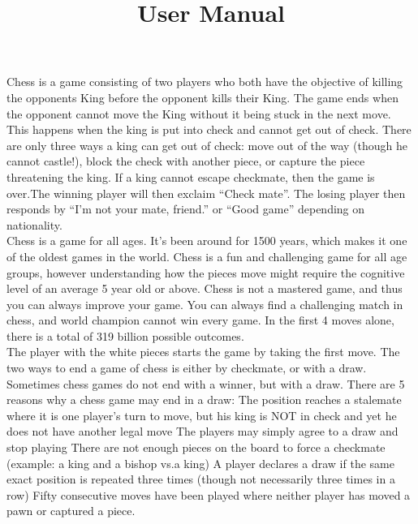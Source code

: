 \documentclass{article}
\begin{document}
\title{User Manual}
\maketitle
Chess is a game consisting of two players who both have the objective of killing the opponents King before the opponent kills their King. The game ends when the opponent cannot move the King without it being stuck in the next move. This happens when the king is put into check and cannot get out of check. There are only three ways a king can get out of check: move out of the way (though he cannot castle!), block the check with another piece, or capture the piece threatening the king. If a king cannot escape checkmate, then the game is over.The winning player will then exclaim “Check mate”. The losing player then responds by “I’m not your mate, friend.” or “Good game” depending on nationality. 
\\

Chess is a game for all ages. It’s been around for 1500 years, which makes it one of the oldest games in the world. Chess is a fun and challenging game for all age groups, however understanding how the pieces move might require the cognitive level of an average 5 year old or above. Chess is not a mastered game, and thus you can always improve your game. You can always find a challenging match in chess, and world champion cannot win every game. In the first 4 moves alone, there is a total of 319 billion possible outcomes.
\\

The player with the white pieces starts the game by taking the first move.
The two ways to end a game of chess is either by checkmate, or with a draw.
\\

Sometimes chess games do not end with a winner, but with a draw. There are 5 reasons why a chess game may end in a draw:
The position reaches a stalemate where it is one player's turn to move, but his king is NOT in check and yet he does not have another legal move
The players may simply agree to a draw and stop playing
There are not enough pieces on the board to force a checkmate (example: a king and a bishop vs.a king)
A player declares a draw if the same exact position is repeated three times (though not necessarily three times in a row)
Fifty consecutive moves have been played where neither player has moved a pawn or captured a piece.
\end{document}
